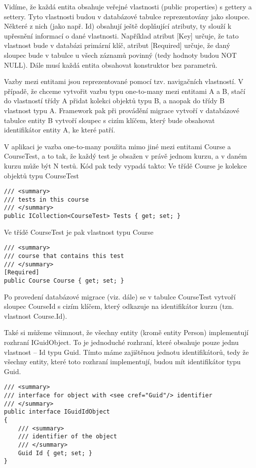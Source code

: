 Vidíme, že každá entita obsahuje veřejné vlastnosti (public properties) s gettery a settery. Tyto vlastnosti budou v databázové tabulce reprezentovány jako sloupce. Některé z nich (jako např. Id) obsahují ještě doplňující atributy, ty slouží k upřesnění informací o dané vlastnosti. Například atribut [Key] určuje, že tato vlastnost bude v databázi primární klíč, atribut [Required] určuje, že daný sloupec bude v tabulce u všech záznamů povinný (tedy hodnoty budou NOT NULL).
Dále musí každá entita obsahovat konstruktor bez parametrů.

Vazby mezi entitami jsou reprezentované pomocí tzv. navigačních vlastností. V případě, že chceme vytvořit vazbu typu one-to-many mezi entitami A a B, stačí do vlastností třídy A přidat kolekci objektů typu B, a naopak do třídy B vlastnost typu A. Framework pak při provádění migrace vytvoří v databázové tabulce entity B vytvoří sloupec s cizím klíčem, který bude obsahovat identifikátor entity A, ke které patří.

V aplikaci je vazba one-to-many použita mimo jiné mezi entitami Course a CourseTest, a to tak, že každý test je obsažen v právě jednom kurzu, a v daném kurzu může být N testů.
Kód pak tedy vypadá takto: Ve třídě Course je kolekce objektů typu CourseTest

\begin{lstlisting}
/// <summary>
/// tests in this course
/// </summary>
public ICollection<CourseTest> Tests { get; set; }
\end{lstlisting}

Ve třídě CourseTest je pak vlastnost typu Course

\begin{lstlisting}
/// <summary>
/// course that contains this test
/// </summary>
[Required]
public Course Course { get; set; }
\end{lstlisting}

Po provedení databázové migrace (viz. dále) se v tabulce CourseTest vytvoří sloupec CourseId s cizím klíčem, který odkazuje na identifikátor kurzu (tzn. vlastnost Course.Id).

Také si můžeme všimnout, že všechny entity (kromě entity Person) implementují rozhraní IGuidObject. To je jednoduché rozhraní, které obsahuje pouze jednu vlastnost -- Id typu Guid. Tímto máme zajištěnou jednotu identifikátorů, tedy že všechny entity, které toto rozhraní implementují, budou mít identifikátor typu Guid.

\begin{lstlisting}
/// <summary>
/// interface for object with <see cref="Guid"/> identifier
/// </summary>
public interface IGuidIdObject
{
	/// <summary>
	/// identifier of the object
	/// </summary>
	Guid Id { get; set; }
}
\end{lstlisting}


